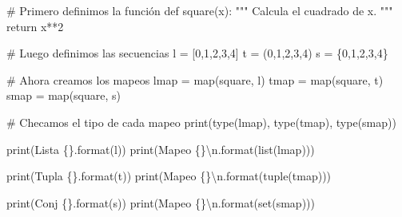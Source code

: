 \documentclass[
  letterpaper,
  DIV=11,
  numbers=noendperiod]{scrreprt}
\newenvironment{Shaded}{\begin{snugshade}}{\end{snugshade}}
\newcommand{\BuiltInTok}[1]{\textcolor[rgb]{0.00,0.23,0.31}{#1}}
\newcommand{\CharTok}[1]{\textcolor[rgb]{0.13,0.47,0.30}{#1}}
\newcommand{\CommentTok}[1]{\textcolor[rgb]{0.37,0.37,0.37}{#1}}
\newcommand{\ControlFlowTok}[1]{\textcolor[rgb]{0.00,0.23,0.31}{#1}}
\newcommand{\DecValTok}[1]{\textcolor[rgb]{0.68,0.00,0.00}{#1}}
\newcommand{\KeywordTok}[1]{\textcolor[rgb]{0.00,0.23,0.31}{#1}}
\newcommand{\NormalTok}[1]{\textcolor[rgb]{0.00,0.23,0.31}{#1}}
\newcommand{\OperatorTok}[1]{\textcolor[rgb]{0.37,0.37,0.37}{#1}}
\newcommand{\SpecialCharTok}[1]{\textcolor[rgb]{0.37,0.37,0.37}{#1}}
\newcommand{\StringTok}[1]{\textcolor[rgb]{0.13,0.47,0.30}{#1}}
\begin{document}
\begin{Shaded}
\begin{Highlighting}[]
\CommentTok{\# Primero definimos la función}
\KeywordTok{def}\NormalTok{ square(x):}
    \CommentTok{"""}
\CommentTok{    Calcula el cuadrado de x.}
\CommentTok{    """}
    \ControlFlowTok{return}\NormalTok{ x}\OperatorTok{**}\DecValTok{2}

\CommentTok{\# Luego definimos las secuencias}
\NormalTok{l }\OperatorTok{=}\NormalTok{ [}\DecValTok{0}\NormalTok{,}\DecValTok{1}\NormalTok{,}\DecValTok{2}\NormalTok{,}\DecValTok{3}\NormalTok{,}\DecValTok{4}\NormalTok{]}
\NormalTok{t }\OperatorTok{=}\NormalTok{ (}\DecValTok{0}\NormalTok{,}\DecValTok{1}\NormalTok{,}\DecValTok{2}\NormalTok{,}\DecValTok{3}\NormalTok{,}\DecValTok{4}\NormalTok{)}
\NormalTok{s }\OperatorTok{=}\NormalTok{ \{}\DecValTok{0}\NormalTok{,}\DecValTok{1}\NormalTok{,}\DecValTok{2}\NormalTok{,}\DecValTok{3}\NormalTok{,}\DecValTok{4}\NormalTok{\}}

\CommentTok{\# Ahora creamos los mapeos}
\NormalTok{lmap }\OperatorTok{=} \BuiltInTok{map}\NormalTok{(square, l)}
\NormalTok{tmap }\OperatorTok{=} \BuiltInTok{map}\NormalTok{(square, t)}
\NormalTok{smap }\OperatorTok{=} \BuiltInTok{map}\NormalTok{(square, s)}

\CommentTok{\# Checamos el tipo de cada mapeo}
\BuiltInTok{print}\NormalTok{(}\BuiltInTok{type}\NormalTok{(lmap), }\BuiltInTok{type}\NormalTok{(tmap), }\BuiltInTok{type}\NormalTok{(smap))}

\BuiltInTok{print}\NormalTok{(}\StringTok{\textquotesingle{}Lista }\SpecialCharTok{\{\}}\StringTok{\textquotesingle{}}\NormalTok{.}\BuiltInTok{format}\NormalTok{(l))}
\BuiltInTok{print}\NormalTok{(}\StringTok{\textquotesingle{}Mapeo }\SpecialCharTok{\{\}}\CharTok{\textbackslash{}n}\StringTok{\textquotesingle{}}\NormalTok{.}\BuiltInTok{format}\NormalTok{(}\BuiltInTok{list}\NormalTok{(lmap)))}

\BuiltInTok{print}\NormalTok{(}\StringTok{\textquotesingle{}Tupla }\SpecialCharTok{\{\}}\StringTok{\textquotesingle{}}\NormalTok{.}\BuiltInTok{format}\NormalTok{(t))}
\BuiltInTok{print}\NormalTok{(}\StringTok{\textquotesingle{}Mapeo }\SpecialCharTok{\{\}}\CharTok{\textbackslash{}n}\StringTok{\textquotesingle{}}\NormalTok{.}\BuiltInTok{format}\NormalTok{(}\BuiltInTok{tuple}\NormalTok{(tmap)))}

\BuiltInTok{print}\NormalTok{(}\StringTok{\textquotesingle{}Conj }\SpecialCharTok{\{\}}\StringTok{\textquotesingle{}}\NormalTok{.}\BuiltInTok{format}\NormalTok{(s))}
\BuiltInTok{print}\NormalTok{(}\StringTok{\textquotesingle{}Mapeo }\SpecialCharTok{\{\}}\CharTok{\textbackslash{}n}\StringTok{\textquotesingle{}}\NormalTok{.}\BuiltInTok{format}\NormalTok{(}\BuiltInTok{set}\NormalTok{(smap)))}
\end{Highlighting}
\end{Shaded}
\end{document}
